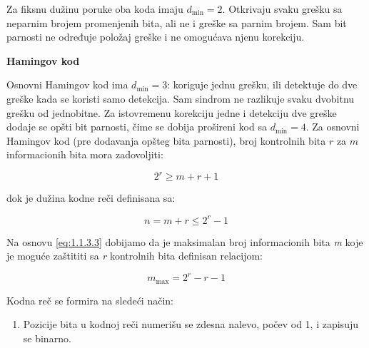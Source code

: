 \documentclass[a4paper,11pt]{article}
\numberwithin{equation}{section}
\begin{document}


Za fiksnu dužinu poruke oba koda imaju $d_{\min}=2$. Otkrivaju svaku grešku sa neparnim brojem promenjenih bita, ali ne i greške sa parnim brojem. Sam bit parnosti ne određuje položaj greške i ne omogućava njenu korekciju.

\textbf{Hamingov kod}



Osnovni Hamingov kod ima $d_{\min}=3$: koriguje jednu grešku, ili detektuje do dve greške kada se koristi samo detekcija. Sam sindrom ne razlikuje svaku dvobitnu grešku od jednobitne. Za istovremenu korekciju jedne i detekciju dve greške dodaje se opšti bit parnosti, čime se dobija prošireni kod sa $d_{\min}=4$. Za osnovni Hamingov kod (pre dodavanja opšteg bita parnosti), broj kontrolnih bita $r$ za $m$ informacionih bita mora zadovoljiti:

\begin{equation}\label{eq:1.1.3.3}
2^{r} \geq m + r + 1
\end{equation}


dok je dužina kodne reči definisana sa:



\begin{equation}\label{eq:1.1.3.4}
n=m+r\le2^r-1
\end{equation}


Na osnovu \eqref{eq:1.1.3.3} dobijamo da je maksimalan broj informacionih bita \emph{m} koje je moguće zaštititi sa \emph{r} kontrolnih bita definisan relacijom:



\begin{equation}\label{eq:1.1.3.5}
m_{\max}=2^r-r-1
\end{equation}


Kodna reč se formira na sledeći način:



\begin{enumerate}[label=\arabic*.,start=1,leftmargin=*]
\item Pozicije bita u kodnoj reči numerišu se zdesna nalevo, počev od 1, i zapisuju se binarno.

\end{enumerate}
\end{document}

